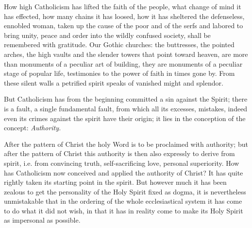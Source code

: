 \documentclass[12pt,a4paper,openany]{book}
\newcommand{\opage}[1]{\marginnote{\footnotesize\textit{[#1]}}}
\begin{document}
How high Catholicism has lifted the faith of the people,
what change of mind it has effected, how many
chains it has loosed, how it has sheltered the
defenseless, ennobled woman, taken up the cause of the poor and of the
serfs and labored to bring unity, peace and
order into the wildly confused society, shall be remembered
with gratitude. Our Gothic churches: the
\setcounter{footnote}{0}%
\opage{74}buttresses, the pointed arches, the high vaults and the slender
towers that point toward heaven, are more than monuments
of a peculiar art of building, they are monuments
of a peculiar stage of popular life, testimonies to
the power of faith in times gone by. From these silent walls
a petrified spirit speaks of vanished might and splendor.

But Catholicism has from the beginning committed
a sin against the Spirit; there is a fault, a single
fundamental fault, from which all its excesses, mistakes, indeed even
its crimes against the spirit have their origin; it lies
in the conception of the concept: \emph{Authority.}

After the pattern of Christ the holy Word is to be proclaimed
with authority; but after the pattern of Christ
this authority is then also expressly to derive
from spirit, i.e. from convincing truth, self-sacrificing
love, personal superiority. How has
Catholicism now conceived and applied the authority of Christ?
It has quite rightly taken its starting point
in the spirit. But however much it has been zealous to
get the personality of the Holy Spirit fixed as dogma,
it is nevertheless unmistakable that in the ordering
of the whole ecclesiastical system it has come to do what
it did not wish, in that it has in reality come
to make its Holy Spirit as impersonal as possible.
\end{document}
